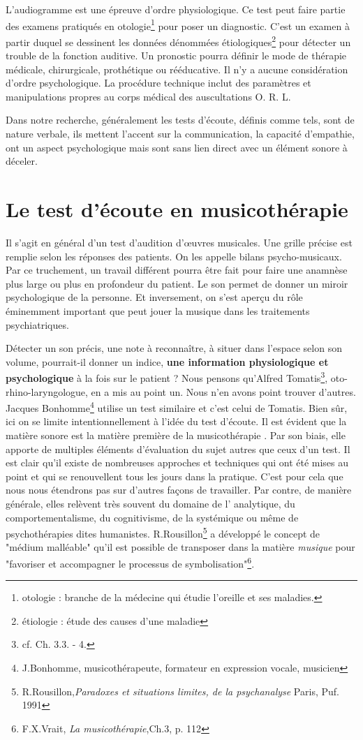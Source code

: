   L'audiogramme est une épreuve d'ordre physiologique. Ce test peut faire partie des examens  pratiqués en otologie\footnote{otologie : branche de la médecine
  	qui étudie l'oreille et ses maladies.} pour poser un diagnostic. 
   C'est un examen à partir duquel se
  dessinent les données dénommées étiologiques\footnote{étiologie : étude des causes
  	d'une maladie} pour détecter un trouble de la fonction auditive. Un pronostic pourra définir le mode de thérapie
médicale, chirurgicale, prothétique ou rééducative.
Il n'y a aucune considération d'ordre psychologique. La procédure technique inclut des paramètres et manipulations propres au corps médical des auscultations O. R. L. 


Dans notre recherche, généralement les tests d'écoute, définis comme tels, sont de nature verbale, ils mettent l'accent sur la communication, la capacité d'empathie, ont un aspect psychologique mais sont sans lien direct avec un élément sonore à déceler. 

\section{Le test d'écoute en musicothérapie}

 Il s'agit en général d'un test d'audition d'\oe uvres musicales. Une grille précise est remplie selon les réponses des patients. On les appelle bilans psycho-musicaux. Par ce truchement, un travail différent pourra être fait pour faire une anamnèse plus large ou plus en profondeur du patient. Le son permet de donner un miroir psychologique de la personne. Et inversement, on s'est aperçu du rôle éminemment important que peut jouer la musique dans les traitements psychiatriques. 
 
 Détecter un son précis, une note à reconnaître,  à situer dans l'espace selon son volume,  pourrait-il donner   un indice, \textbf{une information physiologique et psychologique} à la fois sur le patient ? Nous pensons qu'Alfred Tomatis\footnote{cf. Ch. 3.3. - 4.}, oto-rhino-laryngologue, en a mis au point un. Nous n'en avons point trouver d'autres. Jacques Bonhomme\footnote{J.Bonhomme, musicothérapeute, formateur en expression vocale, musicien} utilise un test similaire et c'est celui de Tomatis. 
 Bien sûr, ici on se limite intentionnellement à l'idée du test d'écoute. Il est évident que la matière sonore est la matière première de la  musicothérapie . Par son biais, elle  apporte de multiples éléments d'évaluation du sujet  autres que ceux d'un test. Il est clair qu'il existe de nombreuses approches et techniques qui ont été mises au point  et qui se renouvellent tous les jours dans la pratique.
 C'est pour cela que nous nous étendrons pas sur d'autres façons de travailler. Par contre, de manière générale, elles relèvent très souvent du domaine de l' analytique, du comportementalisme, du cognitivisme, de la  systémique ou même de psychothérapies dites humanistes.  R.Rousillon\footnote{R.Rousillon,\textit{Paradoxes et situations limites,  de la psychanalyse} Paris, Puf. 1991} a développé le concept de "médium malléable" qu'il est possible de transposer dans la matière \textit{musique} pour "favoriser et accompagner le processus de symbolisation"\footnote{F.X.Vrait, \textit{La musicothérapie},Ch.3, p. 112}.
 
